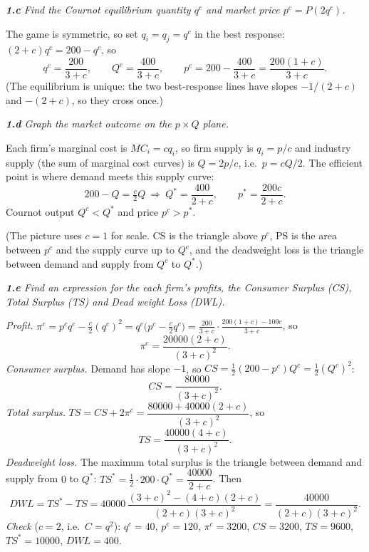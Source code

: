 \documentclass[11pt]{article}
\newcommand{\question}[1]{\par\smallskip\noindent\colorbox{black!6}{\parbox{\dimexpr\linewidth-2\fboxsep}{\itshape #1}}\par\smallskip}
\begin{document}
\question{\textbf{1.c} Find the Cournot equilibrium quantity $q^c$ and market price $p^c=P(2q^c)$.}

The game is symmetric, so set $q_i=q_j=q^c$ in the best response: $(2+c)q^c=200-q^c$, so
\[
q^c=\frac{200}{3+c},\qquad Q^c=\frac{400}{3+c},\qquad
p^c=200-\frac{400}{3+c}=\frac{200(1+c)}{3+c}.
\]
(The equilibrium is unique: the two best-response lines have slopes $-1/(2+c)$ and $-(2+c)$, so they cross once.)

\question{\textbf{1.d} Graph the market outcome on the $p\times Q$ plane.}

Each firm's marginal cost is $MC_i=cq_i$, so firm supply is $q_i=p/c$ and industry supply (the sum of marginal cost curves) is $Q=2p/c$, i.e.\ $p=cQ/2$. The efficient point is where demand meets this supply curve:
\[
200-Q=\tfrac{c}{2}Q\ \Longrightarrow\ Q^*=\frac{400}{2+c},\qquad p^*=\frac{200c}{2+c}.
\]
Cournot output $Q^c<Q^*$ and price $p^c>p^*$.

\begin{center}
\end{center}
(The picture uses $c=1$ for scale. CS is the triangle above $p^c$, PS is the area between $p^c$ and the supply curve up to $Q^c$, and the deadweight loss is the triangle between demand and supply from $Q^c$ to $Q^*$.)

\question{\textbf{1.e} Find an expression for the each firm's profits, the Consumer Surplus (CS), Total Surplus (TS) and Dead weight Loss (DWL).}

\emph{Profit.} $\pi^c=p^cq^c-\tfrac{c}{2}(q^c)^2=q^c\big(p^c-\tfrac{c}{2}q^c\big)
=\frac{200}{3+c}\cdot\frac{200(1+c)-100c}{3+c}$, so
\[
\pi^c=\frac{20000(2+c)}{(3+c)^2}.
\]
\emph{Consumer surplus.} Demand has slope $-1$, so $CS=\tfrac12(200-p^c)Q^c=\tfrac12(Q^c)^2$:
\[
CS=\frac{80000}{(3+c)^2}.
\]
\emph{Total surplus.} $TS=CS+2\pi^c=\dfrac{80000+40000(2+c)}{(3+c)^2}$, so
\[
TS=\frac{40000(4+c)}{(3+c)^2}.
\]
\emph{Deadweight loss.} The maximum total surplus is the triangle between demand and supply from $0$ to $Q^*$: $TS^*=\tfrac12\cdot200\cdot Q^*=\dfrac{40000}{2+c}$. Then
\[
DWL=TS^*-TS=40000\,\frac{(3+c)^2-(4+c)(2+c)}{(2+c)(3+c)^2}=\frac{40000}{(2+c)(3+c)^2}.
\]
\emph{Check} ($c=2$, i.e.\ $C=q^2$): $q^c=40$, $p^c=120$, $\pi^c=3200$, $CS=3200$, $TS=9600$, $TS^*=10000$, $DWL=400$.
\end{document}
